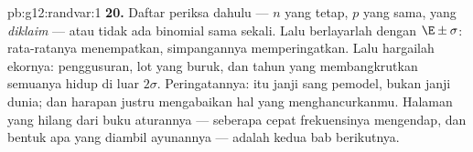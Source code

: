 \begin{solution}{pb:g12:randvar:1}
\textbf{20.} Daftar periksa dahulu --- $n$ yang tetap, $p$ yang sama,
 yang \emph{diklaim} --- atau tidak ada binomial sama sekali. Lalu
berlayarlah dengan $\E \pm \sigma$: rata-ratanya menempatkan, simpangannya memperingatkan.
Lalu hargailah ekornya: penggusuran, lot yang buruk, dan tahun yang membangkrutkan semuanya
hidup di luar $2\sigma$. Peringatannya:  itu janji sang pemodel,
bukan janji dunia; dan harapan justru mengabaikan
hal yang menghancurkanmu. Halaman yang hilang dari buku aturannya --- seberapa cepat
frekuensinya mengendap, dan bentuk apa yang diambil ayunannya ---
adalah kedua bab berikutnya.

\end{solution}
